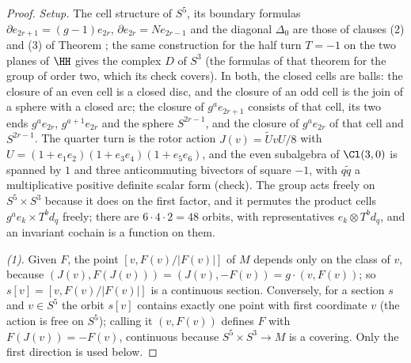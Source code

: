 \begin{proof}
\emph{Setup.} The cell structure of $S^{5}$, its boundary formulas $\partial e_{2r+1} = (g - 1)e_{2r}$, $\partial e_{2r} = Ne_{2r-1}$ and the diagonal $\Delta_{0}$ are those of clauses (2) and (3) of Theorem ; the same construction for the half turn $T = -1$ on the two planes of $\HH$ gives the complex $D$ of $S^{3}$ (the formulas of that theorem for the group of order two, which its check covers). In both, the closed cells are balls: the closure of an even cell is a closed disc, and the closure of an odd cell is the join of a sphere with a closed arc; the closure of $g^{a}e_{2r+1}$ consists of that cell, its two ends $g^{a}e_{2r}$, $g^{a+1}e_{2r}$ and the sphere $S^{2r-1}$, and the closure of $g^{a}e_{2r}$ of that cell and $S^{2r-1}$. The quarter turn is the rotor action $J(v) = \tilde U v U/8$ with $U = (1 + e_{1}e_{2})(1 + e_{3}e_{4})(1 + e_{5}e_{6})$, and the even subalgebra of $\Cl(3,0)$ is spanned by $1$ and three anticommuting bivectors of square $-1$, with $q\tilde q$ a multiplicative positive definite scalar form (check). The group acts freely on $S^{5} \times S^{3}$ because it does on the first factor, and it permutes the product cells $g^{a}e_{k} \times T^{b}d_{q}$ freely; there are $6 \cdot 4 \cdot 2 = 48$ orbits, with representatives $e_{k} \otimes T^{b}d_{q}$, and an invariant cochain is a function on them.

\emph{(1).} Given $F$, the point $[v, F(v)/|F(v)|]$ of $M$ depends only on the class of $v$, because $(J(v), F(J(v))) = (J(v), -F(v)) = g \cdot (v, F(v))$; so $s[v] = [v, F(v)/|F(v)|]$ is a continuous section. Conversely, for a section $s$ and $v \in S^{5}$ the orbit $s[v]$ contains exactly one point with first coordinate $v$ (the action is free on $S^{5}$); calling it $(v, F(v))$ defines $F$ with $F(J(v)) = -F(v)$, continuous because $S^{5} \times S^{3} \to M$ is a covering. Only the first direction is used below.


\end{proof}
